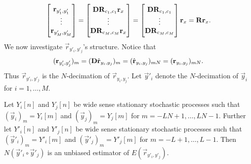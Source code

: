 \documentclass[a4paper, openany, oneside]{memoir}
\begin{document}
\begin{align*}
    \begin{bmatrix}
        \boldsymbol{\mathbf{r}}_{y'_1,y'_1} \\
        \vdots \\
        \boldsymbol{\mathbf{r}}_{y'_M,y'_M}
    \end{bmatrix}
    = \begin{bmatrix}
        \boldsymbol{\mathbf{D}}\boldsymbol{\mathbf{R}}_{c_1,c_1} \boldsymbol{\mathbf{r}}_x \\
        \vdots \\
        \boldsymbol{\mathbf{D}}\boldsymbol{\mathbf{R}}_{c_M,c_M} \boldsymbol{\mathbf{r}}_x
    \end{bmatrix}
    = \begin{bmatrix}
        \boldsymbol{\mathbf{D}}\boldsymbol{\mathbf{R}}_{c_1,c_1}\\
        \vdots \\
        \boldsymbol{\mathbf{D}}\boldsymbol{\mathbf{R}}_{c_M,c_M}
    \end{bmatrix} \boldsymbol{\mathbf{r}}_x
    = \boldsymbol{\mathbf{R}} \boldsymbol{\mathbf{r}}_x.
\end{align*}
We now investigate $\vec{r}_{y'_i,y'_j}$'s structure. Notice that
\begin{align*}
    (\boldsymbol{\mathbf{r}}_{y'_i,y'_j})_m = (\boldsymbol{\mathbf{D}} \hat{\boldsymbol{\mathbf{r}}}_{y_i,y_j})_{m} = (\hat{\boldsymbol{\mathbf{r}}}_{y_i,y_j})_{mN} = (\boldsymbol{\mathbf{r}}_{y_i,y_j})_{mN}.
\end{align*}
Thus $\vec{r}_{y'_i,y'_j}$ is the $N$-decimation of $\vec{r}_{y_i,y_j}$. Let $\vec{y}'_i$ denote the $N$-decimation of $\vec{y}_i$ for $i = 1, \ldots, M$.

\begin{blockTheorem} \label{th:deci-corr}
    Let $Y_i[n]$ and $Y_j[n]$ be wide sense stationary stochastic processes such that $(\vec{y}_i)_m = Y_i[m]$ and $(\vec{y}_j)_m = Y_j[m]$ for $m=-LN+1,\ldots,LN-1$. Further let $Y'_i[n]$ and $Y'_j[n]$ be wide sense stationary stochastic processes such that $(\vec{y}'_i)_m = Y'_i[m]$ and $(\vec{y}'_j)_m = Y'_j[m]$ for $m=-L+1,\ldots,L-1$. Then $N(\vec{y}'_i \circ \vec{y}'_j)$ is an unbiased estimator of $E(\vec{r}_{y'_i,y'_j})$.
\end{blockTheorem}
\end{document}
